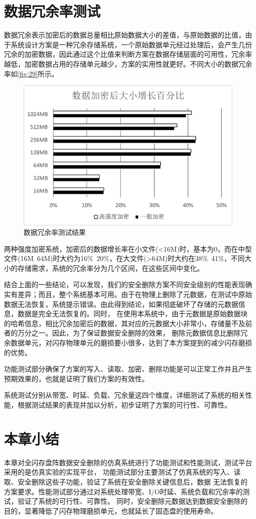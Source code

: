 \section{数据冗余率测试}
数据冗余表示加密后的数据总量相比原始数据大小的差值，与原始数据的比值，由于系统设计方案是一种冗余存储系统，一个原始数据单元经过处理后，会产生几份冗余的加密数据，因此通过这个比值来判断方案在数据存储层面的可用性，冗余率越低，加密数据占用的存储单元越少，方案的实用性就更好。不同大小的数据冗余率如\autoref{fig:29}所示。
\begin{figure}[H]
	\centering
	\includegraphics[width=1\textwidth]{Pics/data-ry.png}
	\caption{数据冗余率测试结果}
	\label{fig:29}
\end{figure}
两种强度加密系统，加密后的数据增长率在小文件(<16M)时，基本为0，而在中型文件(16M~64M)时大约为16\%~20\%，在大文件(>64M)时大约在38\%~41\%，不同大小的存储需求，系统的冗余率分为几个区间，在这些区间中变化。


结合上面的一些结论，可以发现，我们的安全删除方案不同安全级别的性能表现确实有差异；而且，整个系统基本可用。由于在物理上删除了元数据，在测试中原始数据无法恢复，系统提示错误。由此得到结论，如果彻底破坏了存储的元数据信息，数据是完全无法恢复的。同时，
在使用本系统中，由于元数据是原始数据块的哈希信息，相比冗余加密后的数据，其对应的元数据大小非常小，存储量不及前者的万分之一。因此，为了保证数据安全删除的效果，
删除元数据信息比删除冗余数据单元，对闪存物理单元的磨损要小很多，达到了本方案提到的减少闪存磨损的优势。


功能测试部分确保了方案的写入、读取、加密、删除功能是可以正常工作并且产生预期效果的，也就是证明了我们方案的有效性。


系统测试分别从带宽、时延、负载、冗余量这四个维度，详细测试了系统的相关性能，根据测试结果的表现并加以分析，初步证明了方案的可行性、可靠性。

\section{本章小结}
本章对全闪存盘阵数据安全删除的仿真系统进行了功能测试和性能测试，测试平台采用的是仿真实验的实现平台，
功能测试部分主要测试了仿真系统的写入、读取、安全删除这些子功能，验证了系统在安全删除关键信息后，数据
无法恢复的方案要求。性能测试部分通过对系统处理带宽、I/O时延、系统负载和冗余率的测试，验证了系统的可行性、可靠性。
同时，安全删除元数据达到数据安全删除的目的，显著降低了闪存物理磨损单元，也就延长了固态盘的使用寿命。
